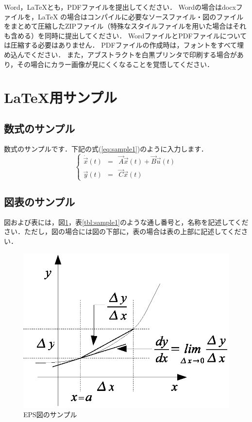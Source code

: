 \documentclass[a4paper, 9pt]{jarticle}
\begin{document}
\begin{論文概要}
Word，\LaTeX とも，PDFファイルを提出してください．
Wordの場合はdocxファイルを，\LaTeX
の場合はコンパイルに必要なソースファイル・図のファイルをまとめて圧縮したZIPファイル（特殊なスタイルファイルを用いた場合はそれも含める）を同時に提出してください．
WordファイルとPDFファイルについては圧縮する必要はありません．
PDFファイルの作成時は，フォントをすべて埋め込んでください．
また，アブストラクトを白黒プリンタで印刷する場合があり，その場合にカラー画像が見にくくなることを覚悟してください．


\section{\LaTeX 用サンプル}

\subsection{数式のサンプル}

数式のサンプルです．下記の式(\ref{eq:sample1})のように入力します．
\begin{equation}
\label{eq:sample1}
\left\{
\begin{array}{lcl}
\dot{\vec{x}}(t)&=&\vec{A}\vec{x}(t)+\vec{B}\vec{u}(t)\\
\vec{y}(t)&=&\vec{C}\vec{x}(t)
\end{array}
\right.
\end{equation}

\subsection{図表のサンプル}
図および表には，図\ref{fig:sample1}，表\ref{tbl:sample1}のような通し番号と，名称を記述してください．ただし，図の場合には図の下部に，表の場合は表の上部に記述してください．

\begin{figure}[ht]
\centering
\includegraphics[width=0.9\columnwidth,clip]{2-1.eps}
\caption{EPS図のサンプル}
\label{fig:sample1}
\end{figure}


\end{論文概要}
\end{document}
